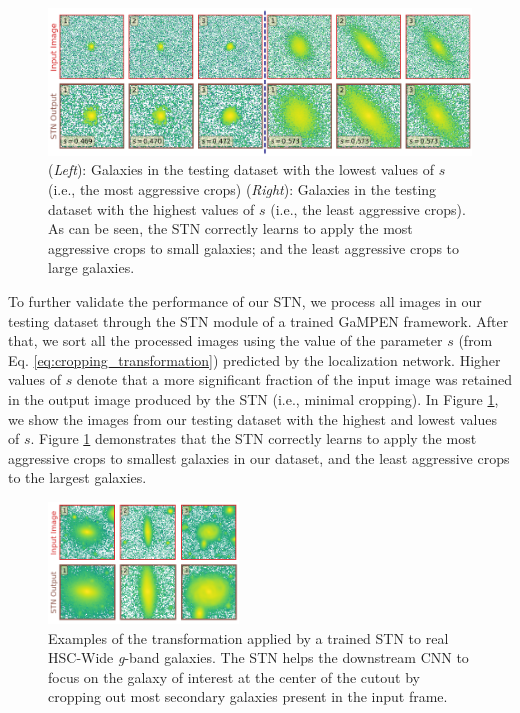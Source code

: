 \documentclass[twocolumn]{aastex63}
\newcommand\gampen{GaMPEN}
\begin{document}
\begin{CJK*}{UTF8}{gbsn}
\begin{figure}[htb]
    \centering
    \includegraphics[width
    =\textwidth]{most_least_crops.png}
    \caption{(\textit{Left}): Galaxies in the testing dataset with the lowest values of $s$ (i.e., the most aggressive crops) (\textit{Right}): Galaxies in the testing dataset with the highest values of $s$ (i.e., the least aggressive crops). As can be seen, the STN correctly learns to apply the most aggressive crops to small galaxies; and the least aggressive crops to large galaxies.}
    \label{fig:most_least_crops}
\end{figure}

To further validate the performance of our STN, we process all images in our testing dataset through the STN module of a trained \gampen{} framework. After that, we sort all the processed images using the value of the parameter $s$ (from Eq. \ref{eq:cropping_transformation}) predicted by the localization network. Higher values of $s$ denote that a more significant fraction of the input image was retained in the output image produced by the STN  (i.e., minimal cropping). In Figure \ref{fig:most_least_crops}, we show the images from our testing dataset with the highest and lowest values of $s$. Figure \ref{fig:most_least_crops} demonstrates that the STN correctly learns to apply the most aggressive crops to smallest galaxies in our dataset, and the least aggressive crops to the largest galaxies.

\begin{figure}[htb]
    \centering
    \includegraphics[width
    =0.45\textwidth]{real_galaxies_stn.png}
    \caption{Examples of the transformation applied by a trained STN to real HSC-Wide \textit{g}-band galaxies. The STN helps the downstream CNN to focus on the galaxy of interest at the center of the cutout by cropping out most secondary galaxies present in the input frame.}
    \label{fig:real_galaxies_stn}
\end{figure}


\end{CJK*}
\end{document}
